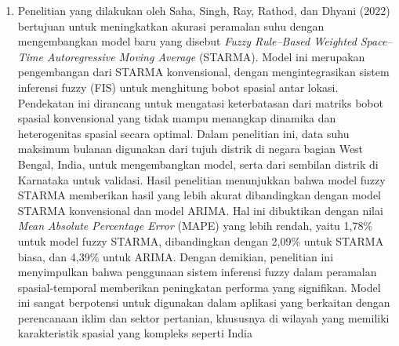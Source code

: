\begin{enumerate}
    Dengan demikian, pendekatan two-stage hybrid model seperti STARMA II terbukti lebih efektif dalam memodelkan dinamika kompleks produksi padi yang dipengaruhi oleh faktor spasial dan temporal, serta memiliki potensi besar untuk diterapkan dalam sistem peringatan dini, perencanaan pertanian, dan pengambilan kebijakan berbasis data \citep{badu-apraku2021two}
    \item Penelitian yang dilakukan oleh Saha, Singh, Ray, Rathod, dan Dhyani (2022) bertujuan untuk meningkatkan akurasi peramalan suhu dengan mengembangkan model baru yang disebut \textit{Fuzzy Rule–Based Weighted } \textit{Space–Time Autoregressive Moving Average} (STARMA). Model ini merupakan pengembangan dari STARMA konvensional, dengan mengintegrasikan sistem inferensi fuzzy (FIS) untuk menghitung bobot spasial antar lokasi. Pendekatan ini dirancang untuk mengatasi keterbatasan dari matriks bobot spasial konvensional yang tidak mampu menangkap dinamika dan heterogenitas spasial secara optimal. Dalam penelitian ini, data suhu maksimum bulanan digunakan dari tujuh distrik di negara bagian West Bengal, India, untuk mengembangkan model, serta dari sembilan distrik di Karnataka untuk validasi. Hasil penelitian menunjukkan bahwa model fuzzy STARMA memberikan hasil yang lebih akurat dibandingkan dengan model STARMA konvensional dan model ARIMA. Hal ini dibuktikan dengan nilai \textit{Mean Absolute Percentage Error} (MAPE) yang lebih rendah, yaitu 1,78\% untuk model fuzzy STARMA, dibandingkan dengan 2,09\% untuk STARMA biasa, dan 4,39\% untuk ARIMA. Dengan demikian, penelitian ini menyimpulkan bahwa penggunaan sistem inferensi fuzzy dalam peramalan spasial-temporal memberikan peningkatan performa yang signifikan. Model ini sangat berpotensi untuk digunakan dalam aplikasi yang berkaitan dengan perencanaan iklim dan sektor pertanian, khususnya di wilayah yang memiliki karakteristik spasial yang kompleks seperti India \citep{saha2022fuzzy} 

\end{enumerate}
